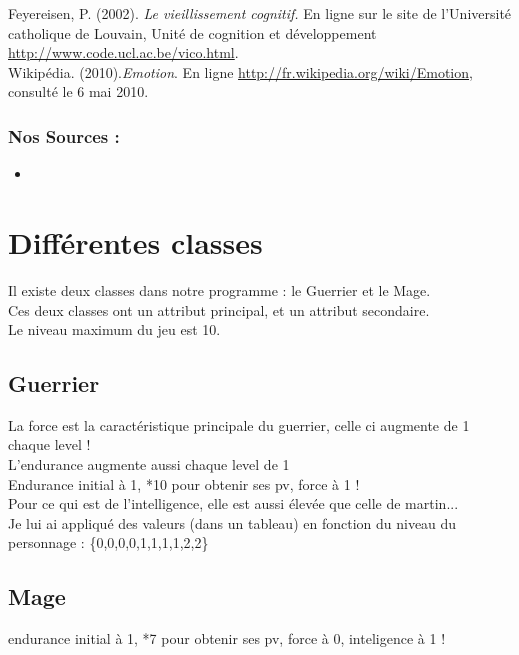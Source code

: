 \documentclass[a4paper,titlepage]{article}
\begin{document}
	Feyereisen, P. (2002). \textit{Le vieillissement cognitif.} En ligne sur le site de l’Université
catholique de Louvain, Unité de cognition et développement \url{http://www.code.ucl.ac.be/vico.html}.\\

	Wikipédia. (2010).\textit{Emotion}. En ligne \url{http://fr.wikipedia.org/wiki/Emotion}, consulté le 6 mai 2010. 
	
\subsubsection*{Nos Sources :}
\begin{itemize}
	\item 
	
\end{itemize}
	
	\clearpage	
	\section*{Différentes classes}
		Il existe deux classes dans notre programme : le Guerrier et le Mage.\\
		Ces deux classes ont un attribut principal, et un attribut secondaire.\\
		Le niveau maximum du jeu est 10.
		
	\subsection*{Guerrier}
		La force est la caractéristique principale du guerrier, celle ci augmente de 1 chaque level !\\
		L'endurance augmente aussi chaque level de 1\\
		Endurance initial à 1, *10 pour obtenir ses pv, force à 1 !\\
		Pour ce qui est de l'intelligence, elle est aussi élevée que celle de martin...\\ Je lui ai appliqué des valeurs (dans un tableau) en fonction du niveau du personnage : 	\{0,0,0,0,1,1,1,1,2,2\}
		
	\subsection*{Mage}
		endurance initial à 1, *7 pour obtenir ses pv, force à 0, inteligence à 1 !
	
\end{document}
